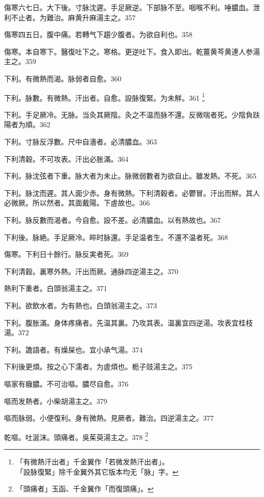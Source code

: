 \documentclass[12pt,twoside,UTF8,b5paper]{ctexbook}
\begin{document}
傷寒六七日。大下後。{寸}脉沈遲。手足厥逆。下部脉不至。咽喉不利。唾膿血。泄利不止者。为難治。麻黄升麻湯主之。357

傷寒四五日。腹中痛。若轉气下趨少腹者。为欲自利也。358

傷寒。本自寒下。醫復吐{下}之。寒格。更逆吐{下}。食入即出。乾薑黄芩黄連人参湯主之。359

下利。有微熱而渴。脉弱者自愈。360

下利。脉數。有微熱。汗出者。自愈。設{脉}復緊。为未觧。361
	\footnote{「有微熱汗出者」千金翼作「若微发熱汗出者」。\\「設脉復緊」除千金翼外其它版本均无「脉」字。}

下利。手足厥{冷}。无脉。{当灸其厥陰。}灸之不温{而脉不還}。反微喘者死。少陰負趺陽者为順。362

下利。寸脉反浮數。尺中自濇者。必清膿血。363

下利清穀。不可攻表。汗出必胀滿。364

下利。脉沈弦者下重。脉大者为未止。脉微弱數者为欲自止。雖发熱。不死。365

下利。脉沈而遲。其人面少赤。身有微熱。下利清穀者。必鬱冒。汗出而觧。其人必微厥。所以然者。其面戴陽。下虗故也。366

下利。脉反數而渴者。今自愈。設不差。必清膿血。以有熱故也。367

下利後。脉絶。手足厥{冷}。晬时脉還。手足温者生。不還{不温}者死。368

傷寒。下利日十餘行。脉反実者死。369

下利清穀。裏寒外熱。汗出而厥。通脉四逆湯主之。370

熱利下重者。白頭翁湯主之。371

下利。欲飲水者。为有熱也。白頭翁湯主之。373

下利。腹{胀}滿。身体疼痛者。先温其裏。乃攻其表。温裏宜四逆湯。攻表宜桂枝湯。372

下利。譫語者。有燥屎也。宜{小}承气湯。374

下利後更煩。按之心下濡者。为虗煩也。栀子{豉}湯主之。375

嘔家有癰膿。不可治嘔。膿尽自愈。376

嘔而发熱者。小柴胡湯主之。379

嘔而脉弱。小便復利。身有微熱。見厥者。難治。四逆湯主之。377

乾嘔。吐涎沫。頭痛者。吳茱萸湯主之。378
	\footnote{「頭痛者」玉函、千金翼作「而復頭痛」。}
\end{document}
